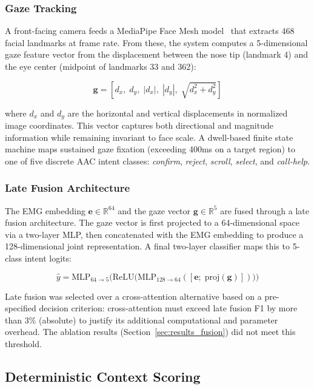 \documentclass[journal]{IEEEtran}
\begin{document}
\subsubsection{Gaze Tracking}
A front-facing camera feeds a MediaPipe Face Mesh model~\cite{mediapipe} that extracts 468 facial landmarks at frame rate. From these, the system computes a 5-dimensional gaze feature vector from the displacement between the nose tip (landmark 4) and the eye center (midpoint of landmarks 33 and 362):

\begin{equation}
\mathbf{g} = [d_x,\; d_y,\; |d_x|,\; |d_y|,\; \sqrt{d_x^2 + d_y^2}]
\label{eq:gaze_vector}
\end{equation}

\noindent where $d_x$ and $d_y$ are the horizontal and vertical displacements in normalized image coordinates. This vector captures both directional and magnitude information while remaining invariant to face scale. A dwell-based finite state machine maps sustained gaze fixation (exceeding 400ms on a target region) to one of five discrete AAC intent classes: \emph{confirm}, \emph{reject}, \emph{scroll}, \emph{select}, and \emph{call-help}.

\subsubsection{Late Fusion Architecture}
The EMG embedding $\mathbf{e} \in \mathbb{R}^{64}$ and the gaze vector $\mathbf{g} \in \mathbb{R}^{5}$ are fused through a late fusion architecture. The gaze vector is first projected to a 64-dimensional space via a two-layer MLP, then concatenated with the EMG embedding to produce a 128-dimensional joint representation. A final two-layer classifier maps this to 5-class intent logits:

\begin{equation}
\hat{y} = \text{MLP}_{64 \rightarrow 5}\big(\text{ReLU}\big(\text{MLP}_{128 \rightarrow 64}([\mathbf{e};\; \text{proj}(\mathbf{g})])\big)\big)
\label{eq:late_fusion}
\end{equation}

Late fusion was selected over a cross-attention alternative based on a pre-specified decision criterion: cross-attention must exceed late fusion F1 by more than 3\% (absolute) to justify its additional computational and parameter overhead. The ablation results (Section~\ref{sec:results_fusion}) did not meet this threshold.

\subsection{Deterministic Context Scoring}
\label{sec:scoring}
\end{document}
